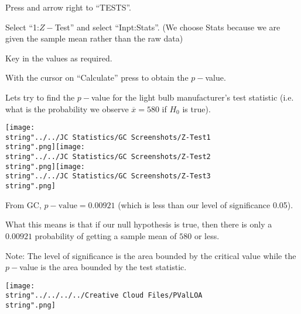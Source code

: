 \documentclass[11pt,a4paper]{book}
\begin{document}
\begin{steps}[leftmargin=1.5cm]

\item  Press \tcbox[box align=base,nobeforeafter,colback=black, colframe=black,size=small]{\textbf{\textcolor{white}{stat}}}
and arrow right to ``TESTS''.

\item  Select ``1:$Z-$Test'' and select ``Inpt:Stats''. (We
choose Stats because we are given the sample mean rather than the
raw data)

\item  Key in the values as required.

\item  With the cursor on ``Calculate'' press \tcbox[box align=base,nobeforeafter,colback=white, colframe=black,size=small]{\textbf{\textcolor{black}{enter}}}
to obtain the $p-$value.

\end{steps}

Lets try to find the $p-$value for the light bulb manufacturer's
test statistic (i.e. what is the probability we observe $\overline{x}=580$
if $H_{0}$ is true).
\begin{center}
\texttt{[image: \\string"../../JC Statistics/GC Screenshots/Z-Test1\\string".png]}\hspace{1cm}\texttt{[image: \\string"../../JC Statistics/GC Screenshots/Z-Test2\\string".png]}\hspace{1cm}\texttt{[image: \\string"../../JC Statistics/GC Screenshots/Z-Test3\\string".png]}
\par\end{center}

From GC, $p-\text{value}=0.00921$ (which is less than our level of
significance 0.05).

What this means is that if our null hypothesis is true, then there
is only a $0.00921$ probability of getting a sample mean of $580$
or less. 

\medskip


\medskip

Note: The level of significance is the area bounded by the critical
value while the $p-$value is the area bounded by the test statistic.
\begin{center}
\texttt{[image: \\string"../../../../Creative Cloud Files/PValLOA\\string".png]}
\par\end{center}
\end{document}
